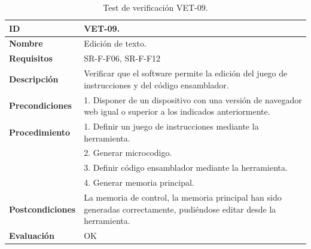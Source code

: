\begin{center}
\begin{table}[htb]
\centering
\caption{Test de verificación VET-09.}
\begin{tabular}{@{}p{2.5cm} p{13cm}@{}} 
\toprule
\textbf{ID} 					& VET-09. \\
\midrule
\textbf{Nombre} 				& Edición de texto. \\
\midrule
\textbf{Requisitos} 		& SR-F-F06, SR-F-F12\\
\midrule
\textbf{Descripción} 		& Verificar que el \gls{software} permite la edición del juego de instrucciones y del código \gls{ensamblador}. \\
\midrule
\textbf{Precondiciones}		& 1. Disponer de un dispositivo con una versión de navegador web igual o superior a los indicados anteriormente. \\
\midrule
\textbf{Procedimiento}		& 1. Definir un juego de instrucciones mediante la herramienta.\\
											& 2. Generar \gls{microcodigo}.\\
											& 3. Definir código \gls{ensamblador} mediante la herramienta.\\
											& 4. Generar memoria principal.\\
\midrule
\textbf{Postcondiciones} 		&  La memoria de control, la memoria principal  han sido generadas correctamente, pudiéndose editar desde la herramienta.\\
\midrule
\textbf{Evaluación} 			& OK \\
\bottomrule
\end{tabular}
\label{tab:vet09}
\end{table}
\end{center}

